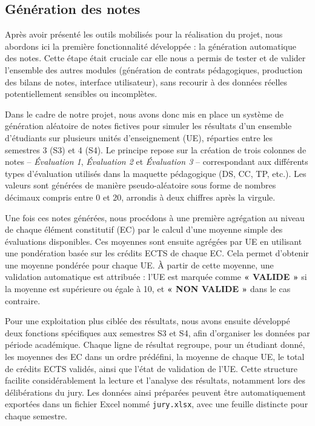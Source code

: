 \subsection{Génération des notes}

Après avoir présenté les outils mobilisés pour la réalisation du projet, nous abordons ici la première fonctionnalité développée : la génération automatique des notes. Cette étape était cruciale car elle nous a permis de tester et de valider l’ensemble des autres modules (génération de contrats pédagogiques, production des bilans de notes, interface utilisateur), sans recourir à des données réelles potentiellement sensibles ou incomplètes.

Dans le cadre de notre projet, nous avons donc mis en place un système de génération aléatoire de notes fictives pour simuler les résultats d’un ensemble d’étudiants sur plusieurs unités d’enseignement (UE), réparties entre les semestres 3 (S3) et 4 (S4). Le principe repose sur la création de trois colonnes de notes – \textit{Évaluation 1}, \textit{Évaluation 2} et \textit{Évaluation 3} – correspondant aux différents types d’évaluation utilisés dans la maquette pédagogique (DS, CC, TP, etc.). Les valeurs sont générées de manière pseudo-aléatoire sous forme de nombres décimaux compris entre 0 et 20, arrondis à deux chiffres après la virgule.

Une fois ces notes générées, nous procédons à une première agrégation au niveau de chaque élément constitutif (EC) par le calcul d’une moyenne simple des évaluations disponibles. Ces moyennes sont ensuite agrégées par UE en utilisant une pondération basée sur les crédits ECTS de chaque EC. Cela permet d’obtenir une moyenne pondérée pour chaque UE. À partir de cette moyenne, une validation automatique est attribuée : l’UE est marquée comme \textbf{« VALIDE »} si la moyenne est supérieure ou égale à 10, et \textbf{« NON VALIDE »} dans le cas contraire.

Pour une exploitation plus ciblée des résultats, nous avons ensuite développé deux fonctions spécifiques aux semestres S3 et S4, afin d’organiser les données par période académique. Chaque ligne de résultat regroupe, pour un étudiant donné, les moyennes des EC dans un ordre prédéfini, la moyenne de chaque UE, le total de crédits ECTS validés, ainsi que l’état de validation de l’UE. Cette structure facilite considérablement la lecture et l’analyse des résultats, notamment lors des délibérations du jury. Les données ainsi préparées peuvent être automatiquement exportées dans un fichier Excel nommé \texttt{jury.xlsx}, avec une feuille distincte pour chaque semestre.

